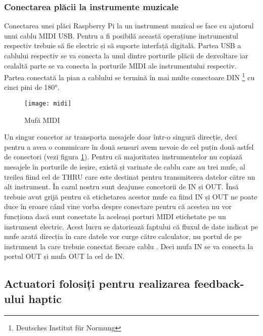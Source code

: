 \documentclass[../IoMusT.tex]{subfiles}
\begin{document}
\subsubsection{Conectarea plăcii la instrumente muzicale}
Conectarea unei plăci Raspberry Pi la un instrument muzical se face cu ajutorul unui cablu MIDI USB. Pentru a fi posibilă această operațiune instrumentul respectiv trebuie să fie electric și să suporte interfață digitală. Partea USB a cablului respectiv se va conecta la unul dintre porturile plăcii de dezvoltare iar cealaltă parte se va conecta la porturile MIDI ale instrumentului respectiv. Partea conectată la pian a cablului se termină în mai multe conectoare DIN \footnote{Deutsches Institut für Normung} cu cinci pini de 180\si{\degree}.
\begin{figure}[h]
\centering
\texttt{[image: midi]}
\caption{Mufă MIDI}
\label{fig:midi}
\end{figure}  
 Un singur concetor ar transporta  mesajele doar într-o singură direcție, deci pentru a avea o comunicare în două sensuri avem nevoie de cel puțin două astfel de conectori (vezi figura \ref{fig:midi}). Pentru că majoritatea instrumentelor nu copiază mesajele în porturile de ieșire, există și varinate de cablu care au trei mufe, al treilea fiind cel de THRU care este destinat pentru transmiterea datelor către un alt instrument. În cazul nostru sunt deajunse concetorii de IN și OUT. Însă trebuie avut grijă pentru că etichetarea acestor mufe ca fiind IN și OUT ne poate duce în eroare când vine vorba despre conectare pentru că acestea nu vor funcționa dacă sunt conectate la aceleași porturi MIDI etichetate pe un instrument electric. Acest lucru se datoriează faptului că fluxul de date indicat pe mufe arată direcția  în care datele vor curge către calculator, nu portul  de pe instrument la care  trebuie conectat fiecare cablu \cite{Midi}. Deci mufa IN se va conecta la portul OUT și mufa OUT la cel de IN.

\subsection{Actuatori folosiți pentru realizarea feedback-ului haptic}
\end{document}
